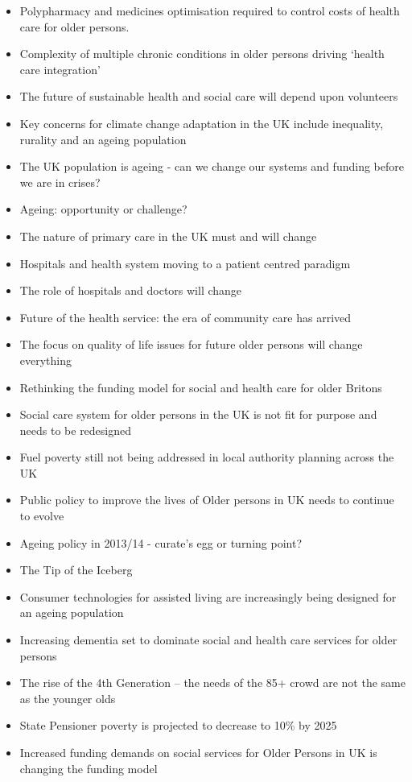 \begin{itemize}
	\item Polypharmacy and medicines optimisation required to control costs of health care for older persons.
	\item Complexity of multiple chronic conditions in older persons driving `health care integration'
	\item The future of sustainable health and social care will depend upon volunteers	
	\item Key concerns for climate change adaptation in the UK include inequality, rurality and an ageing population
	\item The UK population is ageing - can we change our systems and funding before we are in crises?
	\item Ageing: opportunity or challenge?
	\item The nature of primary care in the UK must and will change
	\item Hospitals and health system moving to a patient centred paradigm
	\item The role of hospitals and doctors will change
	\item Future of the health service: the era of community care has arrived
	\item The focus on quality of life issues for future older persons will change everything
	\item Rethinking the funding model for social and health care for older Britons
	\item Social care system for older persons in the UK is not fit for purpose and needs to be redesigned
	\item Fuel poverty still not being addressed in local authority planning across the UK
	\item Public policy to improve the lives of Older persons in UK needs to continue to evolve
	\item Ageing policy in 2013/14 - curate's egg or turning point?
	\item The Tip of the Iceberg
	\item Consumer technologies for assisted living are increasingly being designed for an ageing population
	\item Increasing dementia set to dominate social and health care services for older persons
	\item The rise of the 4th Generation -- the needs of the 85+ crowd are not the same as the younger olds
	\item State Pensioner poverty is projected to decrease to 10\% by 2025
	\item Increased funding demands on social services for Older Persons in UK is changing the funding model

\end{itemize}
